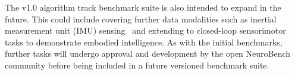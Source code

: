 The v1.0 algorithm track benchmark suite is also intended to expand in the future. This could include covering further data modalities such as inertial measurement unit (IMU) sensing~\cite{fra22har} and extending to closed-loop sensorimotor tasks to demonstrate embodied intelligence. As with the initial benchmarks, further tasks will undergo approval and development by the open NeuroBench community before being included in a future versioned benchmark suite.




